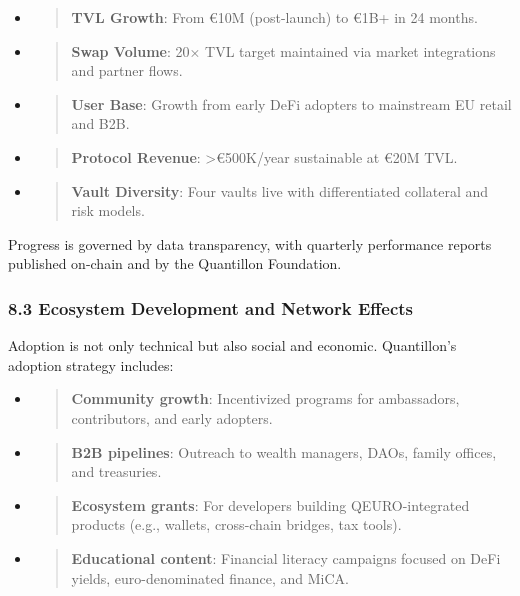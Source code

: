\begin{itemize}
\item
  \begin{quote}
  \textbf{TVL Growth}: From €10M (post-launch) to €1B+ in 24 months.
  \end{quote}
\item
  \begin{quote}
  \textbf{Swap Volume}: 20× TVL target maintained via market
  integrations and partner flows.
  \end{quote}
\item
  \begin{quote}
  \textbf{User Base}: Growth from early DeFi adopters to mainstream EU
  retail and B2B.
  \end{quote}
\item
  \begin{quote}
  \textbf{Protocol Revenue}: \textgreater€500K/year sustainable at €20M
  TVL.
  \end{quote}
\item
  \begin{quote}
  \textbf{Vault Diversity}: Four vaults live with differentiated
  collateral and risk models.
  \end{quote}
\end{itemize}

Progress is governed by data transparency, with quarterly performance
reports published on-chain and by the Quantillon Foundation.

\hypertarget{ecosystem-development-and-network-effects}{%
\subsubsection{8.3 Ecosystem Development and Network
Effects}\label{ecosystem-development-and-network-effects}}

Adoption is not only technical but also social and economic.
Quantillon's adoption strategy includes:

\begin{itemize}
\item
  \begin{quote}
  \textbf{Community growth}: Incentivized programs for ambassadors,
  contributors, and early adopters.
  \end{quote}
\item
  \begin{quote}
  \textbf{B2B pipelines}: Outreach to wealth managers, DAOs, family
  offices, and treasuries.
  \end{quote}
\item
  \begin{quote}
  \textbf{Ecosystem grants}: For developers building QEURO-integrated
  products (e.g., wallets, cross-chain bridges, tax tools).
  \end{quote}
\item
  \begin{quote}
  \textbf{Educational content}: Financial literacy campaigns focused on
  DeFi yields, euro-denominated finance, and MiCA.
  \end{quote}
\end{itemize}

